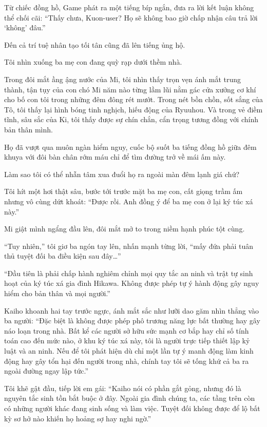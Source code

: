 \documentclass[../main.tex]{subfiles}
\begin{document}
Từ chiếc đồng hồ, Game phát ra một tiếng bíp ngắn, đưa ra lời kết luận không thể chối cãi: ``Thấy chưa, Kuon-user? Họ sẽ không bao giờ chấp nhận câu trả lời `không' đâu.''

Đến cả trí tuệ nhân tạo tối tân cũng đã lên tiếng ủng hộ.

Tôi nhìn xuống ba mẹ con đang quỳ rạp dưới thềm nhà.

Trong đôi mắt ầng ậng nước của Mi, tôi nhìn thấy trọn vẹn ánh mắt trung thành, tận tụy của con chó Mi năm nào từng lầm lũi nằm gác cửa xưởng cơ khí cho bố con tôi trong những đêm đông rét mướt. Trong nét bồn chồn, sốt sắng của Tô, tôi thấy lại hình bóng tinh nghịch, hiếu động của Ryuuhou. Và trong vẻ điềm tĩnh, sâu sắc của Ki, tôi thấy được sự chín chắn, cẩn trọng tương đồng với chính bản thân mình.

Họ đã vượt qua muôn ngàn hiểm nguy, cuốc bộ suốt ba tiếng đồng hồ giữa đêm khuya với đôi bàn chân rớm máu chỉ để tìm đường trở về mái ấm này.

Làm sao tôi có thể nhẫn tâm xua đuổi họ ra ngoài màn đêm lạnh giá chứ?

Tôi hít một hơi thật sâu, bước tới trước mặt ba mẹ con, cất giọng trầm ấm nhưng vô cùng dứt khoát: ``Được rồi. Anh đồng ý để ba mẹ con ở lại ký túc xá này.''

Mi giật mình ngẩng đầu lên, đôi mắt mở to trong niềm hạnh phúc tột cùng.

``Tuy nhiên,'' tôi giơ ba ngón tay lên, nhấn mạnh từng lời, ``mấy đứa phải tuân thủ tuyệt đối ba điều kiện sau đây\dots''

``Đầu tiên là phải chấp hành nghiêm chỉnh mọi quy tắc an ninh và trật tự sinh hoạt của ký túc xá gia đình Hikawa. Không được phép tự ý hành động gây nguy hiểm cho bản thân và mọi người.''

Kaiho khoanh hai tay trước ngực, ánh mắt sắc như lưỡi dao găm nhìn thẳng vào ba người: ``Đặc biệt là không được phép phô trương năng lực bất thường hay gây náo loạn trong nhà. Bất kể các người sở hữu sức mạnh cơ bắp hay chỉ số tính toán cao đến mức nào, ở khu ký túc xá này, tôi là người trực tiếp thiết lập kỷ luật và an ninh. Nếu để tôi phát hiện dù chỉ một lần tự ý manh động làm kinh động hay gây tổn hại đến người trong nhà, chính tay tôi sẽ tống khứ cả ba ra ngoài đường ngay lập tức.''

Tôi khẽ gật đầu, tiếp lời em gái: ``Kaiho nói có phần gắt gỏng, nhưng đó là nguyên tắc sinh tồn bắt buộc ở đây. Ngoài gia đình chúng ta, các tầng trên còn có những người khác đang sinh sống và làm việc. Tuyệt đối không được để lộ bất kỳ sơ hở nào khiến họ hoảng sợ hay nghi ngờ.''
\end{document}
